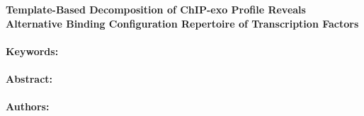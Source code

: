 \noindent
\large {\bf Template-Based Decomposition of ChIP-exo Profile Reveals Alternative Binding Configuration Repertoire of Transcription Factors} 


\normalsize 


\noindent \paragraph{Keywords:} 

\noindent \paragraph{Abstract:} 



\noindent \paragraph{Authors:} 

